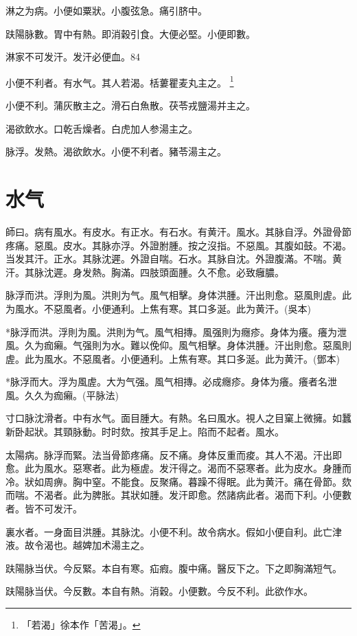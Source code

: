 \documentclass[12pt,twoside,UTF8,b5paper]{ctexbook}
\begin{document}
淋之为病。小便如粟狀。小腹弦急。痛引脐中。

趺陽脉數。胃中有熱。即消穀引食。大便必堅。小便即數。

淋家不可发汗。发汗必便血。84

小便不利者。有水气。其人若渴。栝蔞瞿麦丸主之。
	\footnote{「若渴」徐本作「苦渴」。}

小便不利。蒲灰散主之。滑石白魚散。茯苓戎鹽湯并主之。

渴欲飲水。口乾舌燥者。白虎加人参湯主之。

脉浮。发熱。渴欲飲水。小便不利者。豬苓湯主之。

\chapter{水气}

師曰。病有風水。有皮水。有正水。有石水。有黄汗。風水。其脉自浮。外證骨節疼痛。惡風。皮水。其脉亦浮。外證胕腫。按之沒指。不惡風。其腹如鼓。不渴。当发其汗。正水。其脉沈遲。外證自喘。石水。其脉自沈。外證腹滿。不喘。黄汗。其脉沈遲。身发熱。胸滿。四肢頭面腫。久不愈。必致癰膿。

脉浮而洪。浮則为風。洪則为气。風气相擊。身体洪腫。汗出則愈。惡風則虗。此为風水。不惡風者。小便通利。上焦有寒。其口多涎。此为黄汗。(吳本)

*脉浮而洪。浮則为風。洪則为气。風气相摶。風强則为癮疹。身体为癢。癢为泄風。久为痂癩。气强則为水。難以俛仰。風气相擊。身体洪腫。汗出則愈。惡風則虗。此为風水。不惡風者。小便通利。上焦有寒。其口多涎。此为黄汗。(鄧本)

*脉浮而大。浮为風虗。大为气强。風气相摶。必成癮疹。身体为癢。癢者名泄風。久久为痂癩。(平脉法)

寸口脉沈滑者。中有水气。面目腫大。有熱。名曰風水。視人之目窠上微擁。如蠶新卧起狀。其頸脉動。时时欬。按其手足上。陷而不起者。風水。

太陽病。脉浮而緊。法当骨節疼痛。反不痛。身体反重而痠。其人不渴。汗出即愈。此为風水。惡寒者。此为極虗。发汗得之。渴而不惡寒者。此为皮水。身腫而冷。狀如周痹。胸中窒。不能食。反聚痛。暮躁不得眠。此为黄汗。痛在骨節。欬而喘。不渴者。此为脾胀。其狀如腫。发汗即愈。然諸病此者。渴而下利。小便數者。皆不可发汗。

裏水者。一身面目洪腫。其脉沈。小便不利。故令病水。假如小便自利。此亡津液。故令渴也。越婢加术湯主之。

趺陽脉当伏。今反緊。本自有寒。疝瘕。腹中痛。醫反下之。下之即胸滿短气。

趺陽脉当伏。今反數。本自有熱。消穀。小便數。今反不利。此欲作水。
\end{document}
